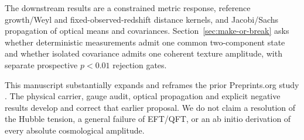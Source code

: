 The downstream results are a constrained metric response, reference
growth/Weyl and fixed-observed-redshift distance kernels, and Jacobi/Sachs
propagation of optical means and covariances. Section~\ref{sec:make-or-break}
asks whether deterministic measurements admit one common two-component
state and whether isolated covariance admits one coherent texture amplitude,
with separate prospective $p<0.01$ rejection gates.

This manuscript substantially expands and reframes the prior
Preprints.org study \citep{Carberry2026Topographic}. The physical carrier,
gauge audit, optical propagation and explicit negative results develop and
correct that earlier proposal. We do not claim a resolution of the Hubble
tension, a general failure of EFT/QFT, or an ab initio derivation of every
absolute cosmological amplitude.
